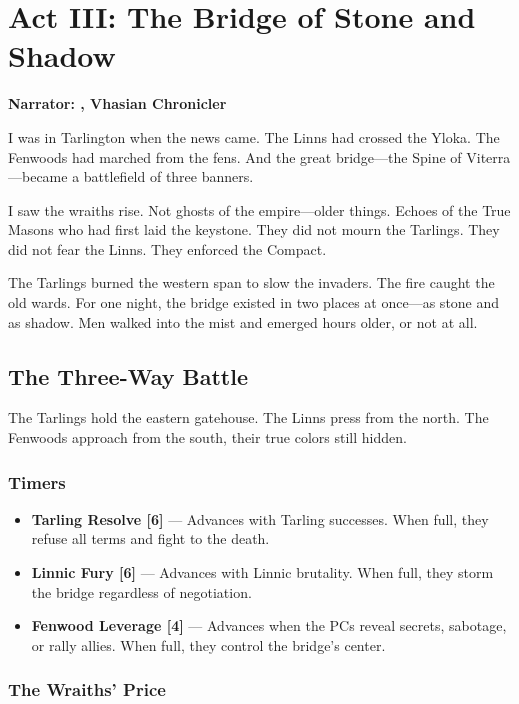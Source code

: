 \documentclass[11pt,a5paper]{book}
\newcommand{\timer}[1]{\textbf{[#1]}}
\begin{document}
\clearpage

\chapter{Act III: The Bridge of Stone and Shadow}
\textbf{Narrator: \mavron, Vhasian Chronicler}

\epigraph{I was in Tarlington when the news came. The Linns had crossed the Yloka. The Fenwoods had marched from the fens. And the great bridge---the Spine of Viterra---became a battlefield of three banners.}{\mavron}

\lettrine{I}{} saw the wraiths rise. Not ghosts of the empire---older things. Echoes of the True Masons who had first laid the keystone. They did not mourn the Tarlings. They did not fear the Linns. They enforced the Compact.

The Tarlings burned the western span to slow the invaders. The fire caught the old wards. For one night, the bridge existed in two places at once---as stone and as shadow. Men walked into the mist and emerged hours older, or not at all.

\section*{The Three-Way Battle}

The Tarlings hold the eastern gatehouse. The Linns press from the north. The Fenwoods approach from the south, their true colors still hidden.

\subsection*{Timers}
\begin{itemize}[leftmargin=*]
\item \textbf{Tarling Resolve \timer{6}} --- Advances with Tarling successes. When full, they refuse all terms and fight to the death.
\item \textbf{Linnic Fury \timer{6}} --- Advances with Linnic brutality. When full, they storm the bridge regardless of negotiation.
\item \textbf{Fenwood Leverage \timer{4}} --- Advances when the PCs reveal secrets, sabotage, or rally allies. When full, they control the bridge's center.
\end{itemize}

\subsection*{The Wraiths' Price}
\end{document}
